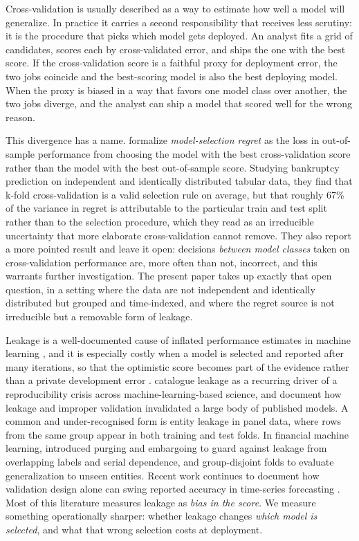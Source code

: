 \documentclass[10pt]{article}
\begin{document}
Cross-validation is usually described as a way to estimate how well a model will
generalize. In practice it carries a second responsibility that receives less
scrutiny: it is the procedure that picks which model gets deployed. An analyst
fits a grid of candidates, scores each by cross-validated error, and ships the
one with the best score. If the cross-validation score is a faithful proxy for
deployment error, the two jobs coincide and the best-scoring model is also the
best deploying model. When the proxy is biased in a way that favors one model
class over another, the two jobs diverge, and the analyst can ship a model that
scored well for the wrong reason.

This divergence has a name. \citet{teodorescu2025regret} formalize
\emph{model-selection regret} as the loss in out-of-sample performance from
choosing the model with the best cross-validation score rather than the model
with the best out-of-sample score. Studying bankruptcy prediction on independent
and identically distributed tabular data, they find that k-fold cross-validation
is a valid selection rule on average, but that roughly 67\% of the variance in
regret is attributable to the particular train and test split rather than to the
selection procedure, which they read as an irreducible uncertainty that more
elaborate cross-validation cannot remove. They also report a more pointed result
and leave it open: decisions \emph{between model classes} taken on
cross-validation performance are, more often than not, incorrect, and this
warrants further investigation. The present paper takes up exactly that open
question, in a setting where the data are not independent and identically
distributed but grouped and time-indexed, and where the regret source is not
irreducible but a removable form of leakage.

Leakage is a well-documented cause of inflated performance estimates in machine
learning \citep{kaufman2012}, and it is especially costly when a model is
selected and reported after many iterations, so that the optimistic score
becomes part of the evidence rather than a private development error
\citep{mcdermott2021}. \citet{kapoor2023leakage} catalogue leakage as a
recurring driver of a reproducibility crisis across machine-learning-based
science, and \citet{roberts2021pitfalls} document how leakage and improper
validation invalidated a large body of published models. A common and
under-recognised form is entity leakage in panel data, where rows from the same
group appear in both training and test folds. In financial machine learning,
\citet{lopezdeprado2018afml} introduced purging and embargoing to guard against
leakage from overlapping labels and serial dependence, and group-disjoint folds
to evaluate generalization to unseen entities. Recent work continues to document
how validation design alone can swing reported accuracy in time-series
forecasting \citep{hiddenleaks2025}. Most of this literature measures leakage as
\emph{bias in the score}. We measure something operationally sharper: whether
leakage changes \emph{which model is selected}, and what that wrong selection
costs at deployment.
\end{document}
